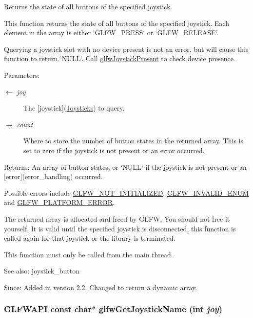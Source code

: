 Returns the state of all buttons of the specified joystick. 

This function returns the state of all buttons of the specified joystick. Each element in the array is either `GLFW\_\-PRESS` or `GLFW\_\-RELEASE`.

Querying a joystick slot with no device present is not an error, but will cause this function to return `NULL`. Call \hyperlink{group__input_g7f81f22f355f4b7d315caf73cdfd9906}{glfwJoystickPresent} to check device presence.

\begin{Desc}
\item[Parameters:]
\begin{description}
\item[\mbox{$\leftarrow$} {\em joy}]The \mbox{[}joystick\mbox{]}(\hyperlink{group__joysticks}{Joysticks}) to query. \item[\mbox{$\rightarrow$} {\em count}]Where to store the number of button states in the returned array. This is set to zero if the joystick is not present or an error occurred. \end{description}
\end{Desc}
\begin{Desc}
\item[Returns:]An array of button states, or `NULL` if the joystick is not present or an \mbox{[}error\mbox{]}(error\_\-handling) occurred.\end{Desc}
Possible errors include \hyperlink{group__errors_g2374ee02c177f12e1fa76ff3ed15e14a}{GLFW\_\-NOT\_\-INITIALIZED}, \hyperlink{group__errors_g76f6bb9c4eea73db675f096b404593ce}{GLFW\_\-INVALID\_\-ENUM} and \hyperlink{group__errors_gd44162d78100ea5e87cdd38426b8c7a1}{GLFW\_\-PLATFORM\_\-ERROR}.

The returned array is allocated and freed by GLFW. You should not free it yourself. It is valid until the specified joystick is disconnected, this function is called again for that joystick or the library is terminated.

This function must only be called from the main thread.

\begin{Desc}
\item[See also:]joystick\_\-button\end{Desc}
\begin{Desc}
\item[Since:]Added in version 2.2.  Changed to return a dynamic array. \end{Desc}
\hypertarget{group__input_gc50a4fd9b01886cf9fa2c45f19191fb8}{
\subsubsection[glfwGetJoystickName]{\setlength{\rightskip}{0pt plus 5cm}GLFWAPI const char$\ast$ glfwGetJoystickName (int {\em joy})}}
\label{group__input_gc50a4fd9b01886cf9fa2c45f19191fb8}


